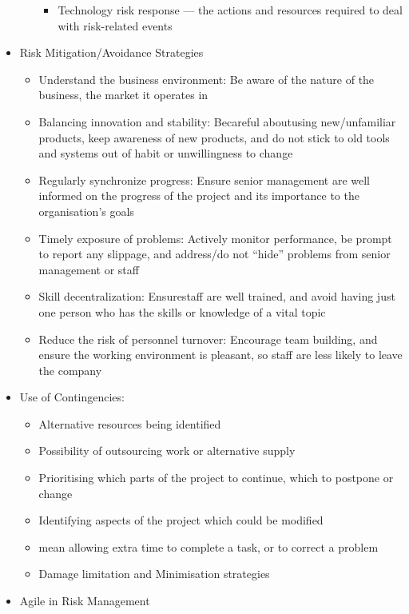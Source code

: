 \documentclass[12pt,openany]{book}
\begin{document}
\begin{itemize}
\begin{itemize}
\begin{itemize}
            \item Technology risk response --- the actions and resources required to deal with risk-related events
        \end{itemize}
    \end{itemize}
    \item Risk Mitigation/Avoidance Strategies
    \begin{itemize}
        \item Understand the business environment: Be aware of the nature of the business, the market it operates in
        \item Balancing innovation and stability: Becareful aboutusing new/unfamiliar products, keep awareness of new products, and do not stick to old tools and systems out of habit or unwillingness to change
        \item Regularly synchronize progress: Ensure senior management are well informed on the progress of the project and its importance to the organisation’s goals
        \item Timely exposure of problems: Actively monitor performance, be prompt to report any slippage, and address/do not “hide” problems from senior management or staff
        \item Skill decentralization: Ensurestaff are well trained, and avoid having just one person who has the skills or knowledge of a vital topic
        \item Reduce the risk of personnel turnover: Encourage team building, and ensure the working environment is pleasant, so staff are less likely to leave the company
    \end{itemize}
    \item Use of Contingencies:
    \begin{itemize}
        \item Alternative resources being identified
        \item Possibility of outsourcing work or alternative supply
        \item Prioritising which parts of the project to continue, which to postpone or change
        \item Identifying aspects of the project which could be modified
        \item mean allowing extra time to complete a task, or to correct a problem
        \item Damage limitation and Minimisation strategies
    \end{itemize}
    \item Agile in Risk Management

\end{itemize}
\end{document}
